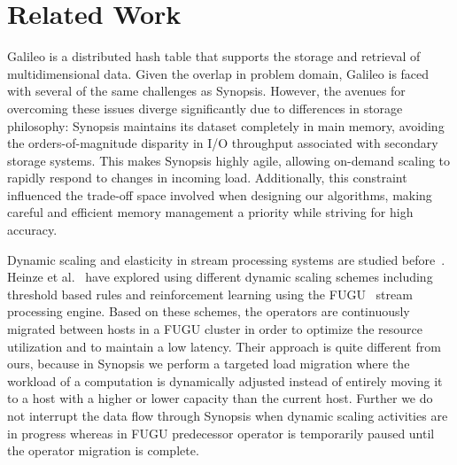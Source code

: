 \section{Related Work}
\label{sec:related}

Galileo \cite{} is a distributed hash table that supports the storage and retrieval of multidimensional data. Given the overlap in problem domain, Galileo is faced with several of the same challenges as Synopsis. However, the avenues for overcoming these issues diverge significantly due to differences in storage philosophy: Synopsis maintains its dataset completely in main memory, avoiding the orders-of-magnitude disparity in I/O throughput associated with secondary storage systems. This makes Synopsis highly agile, allowing on-demand scaling to rapidly respond to changes in incoming load. Additionally, this constraint influenced the trade-off space involved when designing our algorithms, making careful and efficient memory management a priority while striving for high accuracy.

Dynamic scaling and elasticity in stream processing systems are studied before~\cite{heinze2014auto, gulisano2012streamcloud, castro2013integrating, loesing2012stormy, heinze2013elastic}.
Heinze et al.~\cite{heinze2014auto} have explored using different dynamic scaling schemes including threshold based rules and reinforcement learning using the FUGU~\cite{heinze2013elastic} stream processing engine.
Based on these schemes, the operators are continuously migrated between hosts in a FUGU cluster in order to optimize the resource utilization and to maintain a low latency.
Their approach is quite different from ours, because in Synopsis we perform a targeted load migration where the workload of a computation is dynamically adjusted instead of entirely moving it to a host with a higher or lower capacity than the current host.
Further we do not interrupt the data flow through Synopsis when dynamic scaling activities are in progress whereas in FUGU predecessor operator is temporarily paused until the operator migration is complete.